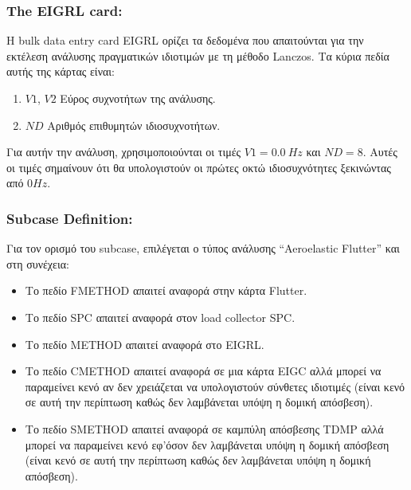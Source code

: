 \subsubsection{\textlatin{The EIGRL card:}}

Η  \textlatin{bulk data entry card EIGRL} ορίζει τα δεδομένα που απαιτούνται για την εκτέλεση ανάλυσης πραγματικών ιδιοτιμών με τη μέθοδο \textlatin{Lanczos}. Τα κύρια πεδία αυτής της κάρτας είναι:

\begin{enumerate}
\def\labelenumi{\arabic{enumi}.}
\item
  $V1$, $V2$ Εύρος συχνοτήτων της ανάλυσης.
\item
  $ND$ Αριθμός επιθυμητών ιδιοσυχνοτήτων.
\end{enumerate}

Για αυτήν την ανάλυση, χρησιμοποιούνται οι τιμές \(V1 = 0.0\ Hz\) και \(ND = 8\).
Αυτές οι τιμές σημαίνουν ότι θα υπολογιστούν οι πρώτες οκτώ ιδιοσυχνότητες ξεκινώντας από $0 Hz$.



\subsubsection{\textlatin{Subcase Definition:}}

Για τον ορισμό του \textlatin{subcase}, επιλέγεται ο τύπος ανάλυσης \textlatin{ ``Aeroelastic Flutter''} και στη συνέχεια:

\begin{itemize}
\item
  Το πεδίο \textlatin{FMETHOD} απαιτεί αναφορά στην κάρτα \textlatin{Flutter}.
\item
  Το πεδίο \textlatin{SPC} απαιτεί αναφορά στον \textlatin{load collector SPC}.
\item
  Το πεδίο \textlatin{METHOD} απαιτεί αναφορά στο \textlatin{EIGRL}.
\item
  Το πεδίο \textlatin{CMETHOD} απαιτεί αναφορά σε μια κάρτα \textlatin{EIGC} αλλά μπορεί να παραμείνει κενό αν δεν χρειάζεται να υπολογιστούν σύνθετες ιδιοτιμές (είναι κενό σε αυτή την περίπτωση καθώς δεν λαμβάνεται υπόψη η δομική απόσβεση).
\item
  Το πεδίο \textlatin{SMETHOD} απαιτεί αναφορά σε καμπύλη απόσβεσης \textlatin{TDMP} αλλά μπορεί να παραμείνει κενό εφ'όσον δεν λαμβάνεται υπόψη η δομική απόσβεση (είναι κενό σε αυτή την περίπτωση καθώς δεν λαμβάνεται υπόψη η δομική απόσβεση).
\end{itemize}

